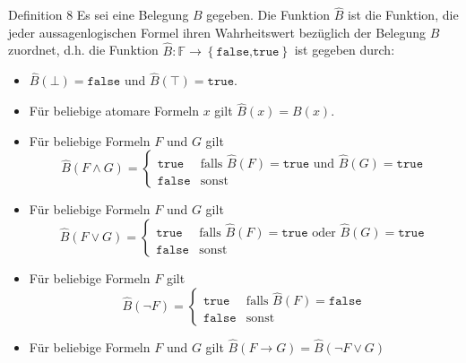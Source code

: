 	\begin{definition}{Definition 8}
		Es sei eine Belegung $B$ gegeben. Die Funktion $\hat{B}$ ist die Funktion, die jeder aussagenlogischen
		Formel ihren Wahrheitswert bezüglich der Belegung $B$ zuordnet, d.h. die Funktion
		$\hat{B}:\mathbb{F}\to\left\{\texttt{false,true}\right\}$ ist gegeben durch:
		\begin{itemize}
			\item $\hat{B}(\bot)=\texttt{false}$ und $\hat{B}(\top)=\texttt{true}.$
			\item Für beliebige atomare Formeln $x$ gilt $\hat{B}(x)=B(x)$.
			\item Für beliebige Formeln $F$ und $G$ gilt
			\begin{equation*}
				\hat{B}(F\land G) = 
				\begin{cases}
					\texttt{true} &\text{falls } \hat{B}(F)=\texttt{true } \text{und } \hat{B}(G)=\texttt{true} \\
					\texttt{false} &\text{sonst}
				\end{cases}
			\end{equation*}
			\item Für beliebige Formeln $F$ und $G$ gilt
			\begin{equation*}
				\hat{B}(F\lor G) = 
				\begin{cases}
					\texttt{true} &\text{falls } \hat{B}(F)=\texttt{true } \text{oder } \hat{B}(G)=\texttt{true} \\
					\texttt{false} &\text{sonst}
				\end{cases}
			\end{equation*}
			\item Für beliebige Formeln $F$ gilt
			\begin{equation*}
				\hat{B}(\neg F) = 
				\begin{cases}
					\texttt{true} &\text{falls } \hat{B}(F)=\texttt{false} \\
					\texttt{false} &\text{sonst}
				\end{cases}
			\end{equation*}
			\item Für beliebige Formeln $F$ und $G$ gilt $\hat{B}(F\to G)=\hat{B}(\neg F \lor G)$
		\end{itemize}
	\end{definition}

